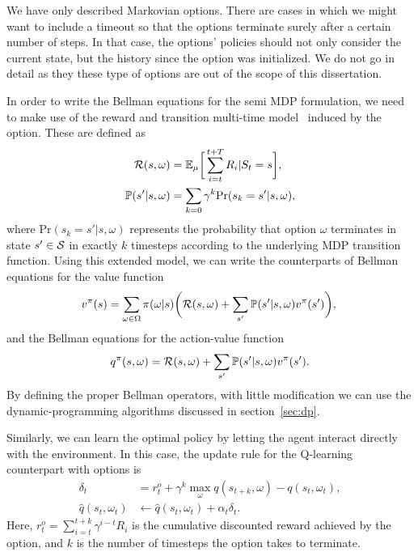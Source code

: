 We have only described Markovian options. There are cases in which we might want to include a timeout so that the options terminate surely after a certain number of steps. In that case, the options' policies should not only consider the current state, but the history since the option was initialized. We do not go in detail as they these type of options are out of the scope of this dissertation.


In order to write the Bellman equations for the semi MDP formulation, we need to make use of the reward and transition multi-time model~\citep{Sutton1999} induced by the option. These are defined as
\begin{align}
  \mathcal{R}(s, \omega) &= \mathbb{E}_\mu\bigg[\sum_{i=t}^{t+T}R_i\lvert S_t=s\bigg],\\
  \mathbb{P}(s'\lvert s, \omega) &= \sum_{k=0} \gamma^k \text{Pr}(s_k = s'\lvert s,\omega),
\end{align}
where $\text{Pr}(s_k = s'\lvert s,\omega)$ represents the probability that option $\omega$ terminates in state $s'\in\mathcal{S}$ in exactly $k$ timesteps according to the underlying MDP transition function. Using this extended model, we can write the counterparts of Bellman equations for the value function
\begin{equation}
  v^\pi(s) = \sum_{\omega\in\Omega}\pi(\omega\lvert s)\bigg(\mathcal{R}(s,\omega) + \sum_{s'}\mathbb{P}(s'\lvert s, \omega)v^\pi(s')\bigg),\\
\end{equation}
and the Bellman equations for the action-value function
\begin{equation}
  q^\pi(s, \omega) = \mathcal{R}(s,\omega) + \sum_{s'}\mathbb{P}(s'\lvert s, \omega)v^\pi(s').\\
\end{equation}
By defining the proper Bellman operators, with little modification we can use the dynamic-programming algorithms discussed in section~\ref{sec:dp}.

Similarly, we can learn the optimal policy by letting the agent interact directly with the environment. In this case, the update rule for the Q-learning counterpart with options is
\begin{align}
  \delta_t &= r^o_t + \gamma^k \max_{\omega} q(s_{t+k}, \omega) - q(s_t, \omega_t),\\
  \widehat q(s_t, \omega_t) &\gets \widehat q(s_t, \omega_t) + \alpha_t \delta_t.
\end{align}
Here, $r^o_t = \sum_{i=t}^{t+k}\gamma^{i-t}R_i$ is the cumulative discounted reward achieved by the option, and $k$ is the number of timesteps the option takes to terminate.

